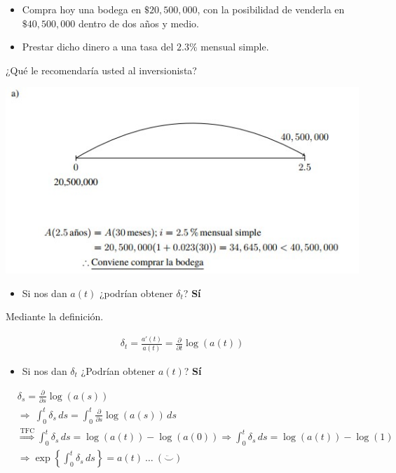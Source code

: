 \documentclass[
]{book}
\providecommand{\tightlist}{%
  \setlength{\itemsep}{0pt}\setlength{\parskip}{0pt}}
\theoremstyle{definition}
\theoremstyle{definition}
\theoremstyle{definition}
\theoremstyle{definition}
\theoremstyle{remark}
\begin{document}
\begin{itemize}
\tightlist
\item
  Compra hoy una bodega en \(\$20,500,000\), con la posibilidad de venderla en \(\$40,500,000\) dentro de dos años y medio.
\item
  Prestar dicho dinero a una tasa del \(2.3\%\) mensual simple.
\end{itemize}

¿Qué le recomendaría usted al inversionista?

\includegraphics{images/7.jpg}

\begin{itemize}
\tightlist
\item
  Si nos dan \(a(t)\) ¿podrían obtener \(\delta_t\)? \textbf{Sí}
\end{itemize}

Mediante la definición.

\begin{align*}
&\delta_t = \frac{a'(t)}{a(t)} = \frac{\partial}{\partial t} \log(a(t))&
\end{align*}

\begin{itemize}
\tightlist
\item
  Si nos dan \(\delta_t\) ¿Podrían obtener \(a(t)\)? \textbf{Sí}
\end{itemize}

\begin{align*}
&\delta_s = \frac{\partial}{\partial s} \log(a(s))&\\
& \Longrightarrow \: \int_{0}^{t} \delta_s \, ds = \int_{0}^{t} \frac{\partial}{\partial s}\log(a(s)) \, ds &\\
& \stackrel{\text{TFC}}{\Longrightarrow} \int_{0}^{t} \delta_s \, ds  = \log(a(t)) - \log(a(0)) \Longrightarrow  \int_{0}^{t} \delta_s \, ds = \log(a(t)) - \log(1)&\\
&\Longrightarrow \exp\left\lbrace  \int_{0}^{t} \delta_s \, ds \right\rbrace  = a(t) \: \ldots \: (\ddot\smile)&
\end{align*}
\end{document}
